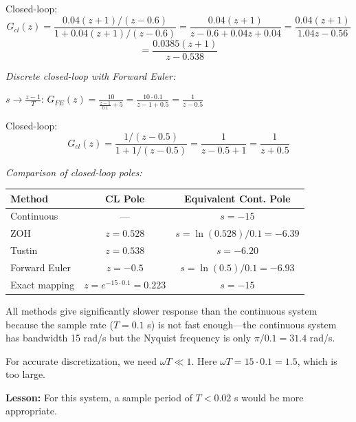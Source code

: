 \begin{example}
Closed-loop:
\begin{equation}
G_{cl}(z) = \frac{0.04(z+1)/(z-0.6)}{1 + 0.04(z+1)/(z-0.6)} = \frac{0.04(z+1)}{z - 0.6 + 0.04z + 0.04} = \frac{0.04(z+1)}{1.04z - 0.56}
\end{equation}
\begin{equation}
= \frac{0.0385(z+1)}{z - 0.538}
\end{equation}

\textit{Discrete closed-loop with Forward Euler:}

$s \to \frac{z-1}{T}$: $G_{FE}(z) = \frac{10}{\frac{z-1}{0.1} + 5} = \frac{10 \cdot 0.1}{z - 1 + 0.5} = \frac{1}{z - 0.5}$

Closed-loop:
\begin{equation}
G_{cl}(z) = \frac{1/(z-0.5)}{1 + 1/(z-0.5)} = \frac{1}{z - 0.5 + 1} = \frac{1}{z + 0.5}
\end{equation}

\textit{Comparison of closed-loop poles:}

\begin{center}
\begin{tabular}{lcc}
\toprule
\textbf{Method} & \textbf{CL Pole} & \textbf{Equivalent Cont. Pole} \\
\midrule
Continuous & --- & $s = -15$ \\
ZOH & $z = 0.528$ & $s = \ln(0.528)/0.1 = -6.39$ \\
Tustin & $z = 0.538$ & $s = -6.20$ \\
Forward Euler & $z = -0.5$ & $s = \ln(0.5)/0.1 = -6.93$ \\
Exact mapping & $z = e^{-15 \cdot 0.1} = 0.223$ & $s = -15$ \\
\bottomrule
\end{tabular}
\end{center}

All methods give significantly slower response than the continuous system because the sample rate ($T = 0.1$ s) is not fast enough---the continuous system has bandwidth 15 rad/s but the Nyquist frequency is only $\pi/0.1 = 31.4$ rad/s.

For accurate discretization, we need $\omega T \ll 1$. Here $\omega T = 15 \cdot 0.1 = 1.5$, which is too large.

\textbf{Lesson:} For this system, a sample period of $T < 0.02$ s would be more appropriate.
\end{example}

